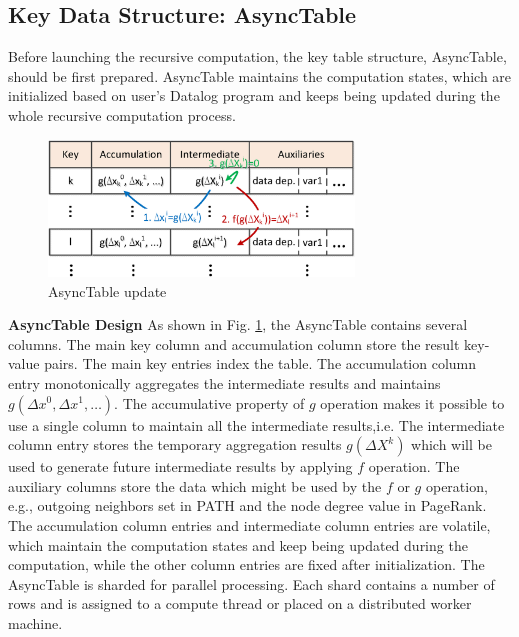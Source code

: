\subsection{Key Data Structure: AsyncTable}
\label{sec:system:data}

Before launching the recursive computation, the key table structure, AsyncTable, should be first prepared. AsyncTable maintains the computation states, which are initialized based on user's Datalog program and keeps being updated during the whole recursive computation process.

\begin{figure}[!t]
    \centering
  \includegraphics[width=3.2in]{fig/asynctable}
  \vspace{-0.0in}
  \caption{AsyncTable update}
  \label{fig:asynctable}
  \vspace{-0.0in}
\end{figure}


\noindent\textbf{AsyncTable Design}
As shown in Fig. \ref{fig:asynctable}, the AsyncTable contains several columns. The main key column and accumulation column store the result key-value pairs. The main key entries index the table. The accumulation column entry monotonically aggregates the intermediate results and maintains $g(\Delta x^0,\Delta x^1,\ldots)$. The accumulative property of $g$ operation makes it possible to use a single column to maintain all the intermediate results,i.e. The intermediate column entry stores the temporary aggregation results $g(\Delta X^k)$ which will be used to generate future intermediate results by applying $f$ operation. The auxiliary columns store the data which might be used by the $f$ or $g$ operation, e.g., outgoing neighbors set in PATH and the node degree value in PageRank. The accumulation column entries and intermediate column entries are volatile, which maintain the computation states and keep being updated during the computation, while the other column entries are fixed after initialization. The AsyncTable is sharded for parallel processing. Each shard contains a number of rows and is assigned to a compute thread or placed on a distributed worker machine.

